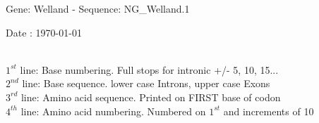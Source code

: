 \documentclass{article}
\begin{document}
\renewcommand{\footrulewidth}{1pt}
\renewcommand{\headrulewidth}{0pt}
\begin{center}
\begin{large}
 Gene: Welland - Sequence: NG\_Welland.1
 
 Date : \today\\\\
\end{large}
\end{center}
$1^{st}$ line: Base numbering. Full stops for intronic +/- 5, 10, 15...\\
$2^{nd}$ line: Base sequence. lower case Introns, upper case Exons\\
$3^{rd}$ line: Amino acid sequence. Printed on FIRST base of codon\\
$4^{th}$ line: Amino acid numbering. Numbered on $1^{st}$ and increments of 10\\
\end{document}
